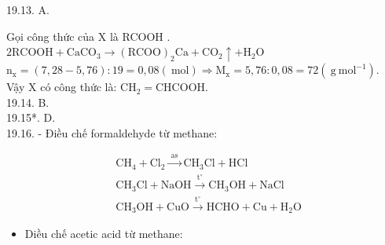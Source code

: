\documentclass[10pt]{article}
\begin{document}
19.13. A.

Gọi công thức của X là RCOOH .\\
$2 \mathrm{RCOOH}+\mathrm{CaCO}_{3} \longrightarrow(\mathrm{RCOO})_{2} \mathrm{Ca}+\mathrm{CO}_{2} \uparrow+\mathrm{H}_{2} \mathrm{O}$\\
$\mathrm{n}_{\mathrm{x}}=(7,28-5,76): 19=0,08(\mathrm{~mol}) \Rightarrow \mathrm{M}_{\mathrm{x}}=5,76: 0,08=72\left(\mathrm{~g} \mathrm{~mol}^{-1}\right)$.\\
Vậy X có công thức là: $\mathrm{CH}_{2}=\mathrm{CHCOOH}$.\\
19.14. B.\\
19.15*. D.\\
19.16. - Điều chế formaldehyde từ methane:

$$
\begin{aligned}
& \mathrm{CH}_{4}+\mathrm{Cl}_{2} \xrightarrow{\text { as }} \mathrm{CH}_{3} \mathrm{Cl}+\mathrm{HCl} \\
& \mathrm{CH}_{3} \mathrm{Cl}+\mathrm{NaOH} \xrightarrow{\mathrm{t}^{\circ}} \mathrm{CH}_{3} \mathrm{OH}+\mathrm{NaCl} \\
& \mathrm{CH}_{3} \mathrm{OH}+\mathrm{CuO} \xrightarrow{\mathrm{t}^{\circ}} \mathrm{HCHO}+\mathrm{Cu}+\mathrm{H}_{2} \mathrm{O}
\end{aligned}
$$

\begin{itemize}
  \item Diều chế acetic acid từ methane:
\end{itemize}
\end{document}
